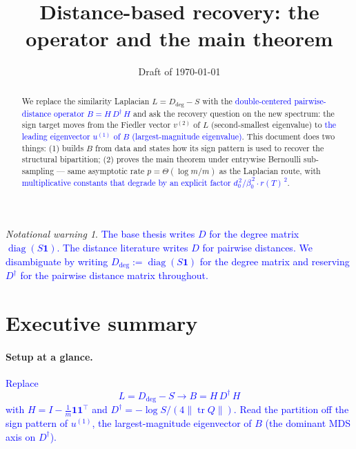 \documentclass[11pt]{article}
\title{Distance-based recovery: the operator and the main theorem}
\author{}
\date{Draft of \today}
\newcommand{\new}[1]{\textcolor{blue}{#1}}
\theoremstyle{remark}
\newtheorem*{notation}{Notational warning}
\newcommand{\1}{\mathbf{1}}
\newcommand{\Tr}{\operatorname{tr}}
\newcommand{\diag}{\operatorname{diag}}
\newcommand{\Ddeg}{D_{\mathrm{deg}}}
\newcommand{\Ddist}{D^{\dagger}}      %
\newcommand{\Bop}{B}
\newcommand{\Hop}{H}                  %
\newcommand{\rT}{r(T)}                %
\begin{document}
\maketitle

\begin{abstract}
We replace the similarity Laplacian $L = \Ddeg - S$ with the
\new{double-centered pairwise-distance operator $\Bop = \Hop\,\Ddist\,\Hop$}
and ask the recovery question on the new spectrum:
the sign target moves from the Fiedler vector $v^{(2)}$ of $L$
(second-smallest eigenvalue) to \new{the leading eigenvector $u^{(1)}$ of
$\Bop$ (largest-magnitude eigenvalue)}.
This document does two things: (1) builds $\Bop$ from data and states how
its sign pattern is used to recover the structural bipartition; (2)
proves the main theorem under entrywise Bernoulli sub-sampling — same
asymptotic rate $p = \Theta(\log m / m)$ as the Laplacian route, with
\new{multiplicative constants that degrade by an explicit factor
$d_0^{\,2}/\beta_0^{\,2}\cdot \rT^{\,2}$}.
\end{abstract}

\begin{notation}
\new{The base thesis writes $D$ for the degree matrix $\diag(S\1)$.
The distance literature writes $D$ for pairwise distances.
We disambiguate by writing $\Ddeg := \diag(S\1)$ for the degree matrix
and reserving $\Ddist$ for the pairwise distance matrix throughout.}
\end{notation}

\section*{Executive summary}

\paragraph{Setup at a glance.}
\new{Replace 
$$L = \Ddeg - S ֿ\longrightarrow \Bop = \Hop\,\Ddist\,\Hop$$ 
with
$\Hop = I - \tfrac{1}{m}\1\1^{\!\top}$ and $\Ddist = -\log S / (4\|\Tr Q\|)$.
Read the partition off the sign pattern of $u^{(1)}$, the
largest-magnitude eigenvector of $\Bop$ (the dominant MDS axis on
$\Ddist$).}
\end{document}
